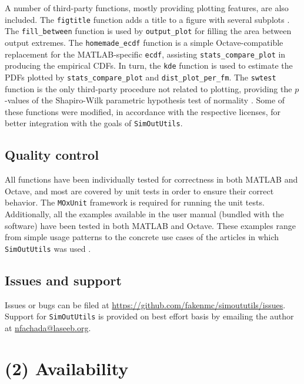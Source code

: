 \documentclass{article}
\newcommand{\progfunc}{\textnhtt}
\newcommand{\swpackage}{\texttt}
\begin{document}
A number of third-party functions, mostly providing plotting features, are also included. The \progfunc{figtitle} function adds a title to a figure with several subplots \cite{greene2013figtitle}. The \progfunc{fill\_between} function \cite{vincent2014fill} is used by \progfunc{output\_plot} for filling the area between output extremes. The \progfunc{homemade\_ecdf} function \cite{boutin2011homemade} is a simple Octave-compatible replacement for the MATLAB-specific \progfunc{ecdf}, assisting \progfunc{stats\_compare\_plot} in producing the empirical CDFs. In turn, the \progfunc{kde} function \cite{botev2010kernel} is used to estimate the PDFs plotted by \progfunc{stats\_compare\_plot} and \progfunc{dist\_plot\_per\_fm}. The \progfunc{swtest} function is the only third-party procedure not related to plotting, providing the $p$-values of the Shapiro-Wilk parametric hypothesis test of normality \cite{saida2007shapiro}. Some of these functions were modified, in accordance with the respective licenses, for better integration with the goals of \swpackage{SimOutUtils}.

\subsection*{Quality control}

All functions have been individually tested for correctness in both MATLAB and Octave, and most are covered by unit tests in order to ensure their correct behavior. The \swpackage{MOxUnit} framework \cite{oosterhof2015} is required for running the unit tests. Additionally, all the examples available in the user manual (bundled with the software) have been tested in both MATLAB and Octave. These examples range from simple usage patterns to the concrete use cases of the articles in which \swpackage{SimOutUtils} was used \cite{fachada2015template,fachada2015parallelization,fachada2015model}.

\subsection*{Issues and support}

Issues or bugs can be filed at \url{https://github.com/fakenmc/simoututils/issues}. Support for \swpackage{SimOutUtils} is provided on best effort basis by emailing the author at \href{mailto:nfachada@laseeb.org}{nfachada@laseeb.org}.

\section*{(2) Availability}
\end{document}
